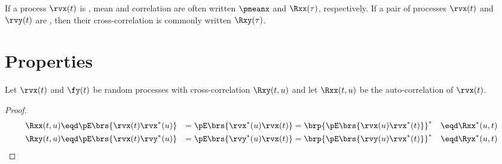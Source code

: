 If a process $\rvx(t)$ is , mean and correlation are often written
$\pmeanx$ and $\Rxx(\tau)$, respectively.
If a pair of processes $\rvx(t)$ and $\rvy(t)$ are ,
then their cross-correlation is commonly written $\Rxy(\tau)$.

\section{Properties}
\begin{theorem}
\label{thm:Rxx_prop}
Let $\rvx(t)$ and $\fy(t)$ be random processes with
cross-correlation $\Rxy(t,u)$ and
let $\Rxx(t,u)$ be the auto-correlation of $\rvx(t)$.
\end{theorem}
\begin{proof}
\begin{align*}
   \Rxx(t,u)
      &\eqd \pE\brs{\rvx(t) \rvx^\ast(u)}
      &=    \pE\brs{\rvx^\ast(u) \rvx(t)}
      &=    \brp{ \pE\brs{\rvx(u) \rvx^\ast(t)}}^\ast
      &\eqd \Rxx^\ast(u,t)
\\
   \Rxy(t,u)
      &\eqd \pE\brs{\rvx(t) \rvy^\ast(u)}
      &=    \pE\brs{\rvy^\ast(u) \rvx(t) }
      &=    \brp{\pE\brs{\rvy(u) \rvx^\ast(t)}}^\ast
      &\eqd \Ryx^\ast(u,t)
\end{align*}
\end{proof}

